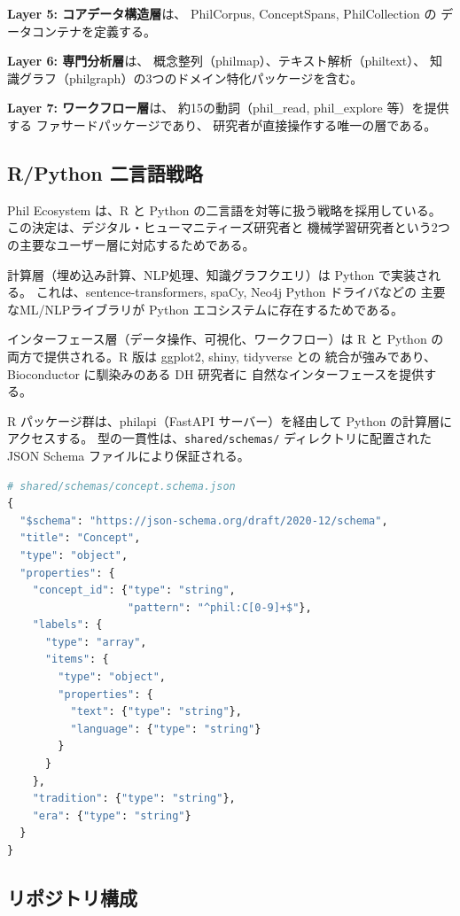\documentclass[a4paper,11pt]{ltjsarticle}
\begin{document}
\textbf{Layer 5: コアデータ構造層}は、
PhilCorpus, ConceptSpans, PhilCollection の
データコンテナを定義する。

\textbf{Layer 6: 専門分析層}は、
概念整列（philmap）、テキスト解析（philtext）、
知識グラフ（philgraph）の3つのドメイン特化パッケージを含む。

\textbf{Layer 7: ワークフロー層}は、
約15の動詞（phil\_read, phil\_explore 等）を提供する
ファサードパッケージであり、
研究者が直接操作する唯一の層である。

\subsection{R/Python 二言語戦略}

Phil Ecosystem は、R と Python の二言語を対等に扱う戦略を採用している。
この決定は、デジタル・ヒューマニティーズ研究者と
機械学習研究者という2つの主要なユーザー層に対応するためである。

計算層（埋め込み計算、NLP処理、知識グラフクエリ）は Python で実装される。
これは、sentence-transformers, spaCy, Neo4j Python ドライバなどの
主要なML/NLPライブラリが Python エコシステムに存在するためである。

インターフェース層（データ操作、可視化、ワークフロー）は
R と Python の両方で提供される。R 版は ggplot2, shiny, tidyverse との
統合が強みであり、Bioconductor に馴染みのある DH 研究者に
自然なインターフェースを提供する。

R パッケージ群は、philapi（FastAPI サーバー）を経由して
Python の計算層にアクセスする。
型の一貫性は、\texttt{shared/schemas/} ディレクトリに配置された
JSON Schema ファイルにより保証される。

\begin{lstlisting}[caption=JSON Schema による型定義の共有,language=Python]
# shared/schemas/concept.schema.json
{
  "$schema": "https://json-schema.org/draft/2020-12/schema",
  "title": "Concept",
  "type": "object",
  "properties": {
    "concept_id": {"type": "string",
                   "pattern": "^phil:C[0-9]+$"},
    "labels": {
      "type": "array",
      "items": {
        "type": "object",
        "properties": {
          "text": {"type": "string"},
          "language": {"type": "string"}
        }
      }
    },
    "tradition": {"type": "string"},
    "era": {"type": "string"}
  }
}
\end{lstlisting}

\subsection{リポジトリ構成}
\end{document}
